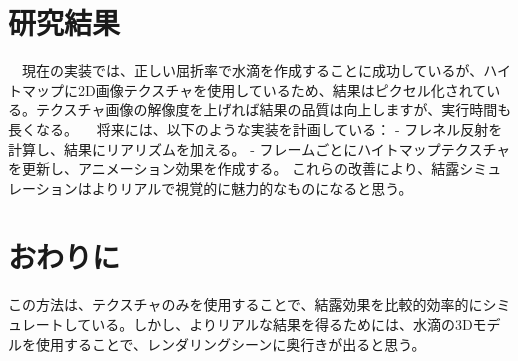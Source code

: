 \documentclass[dvipdfmx,uplatex,11pt]{jabstract}
\begin{document}
\begin{multicols}{2}
\section{研究結果}
　現在の実装では、正しい屈折率で水滴を作成することに成功しているが、ハイトマップに2D画像テクスチャを使用しているため、結果はピクセル化されている。テクスチャ画像の解像度を上げれば結果の品質は向上しますが、実行時間も長くなる。
　将来には、以下のような実装を計画している： 
- フレネル反射を計算し、結果にリアリズムを加える。
- フレームごとにハイトマップテクスチャを更新し、アニメーション効果を作成する。
これらの改善により、結露シミュレーションはよりリアルで視覚的に魅力的なものになると思う。

\section{おわりに}
この方法は、テクスチャのみを使用することで、結露効果を比較的効率的にシミュレートしている。しかし、よりリアルな結果を得るためには、水滴の3Dモデルを使用することで、レンダリングシーンに奥行きが出ると思う。





\end{multicols}
\end{document}
